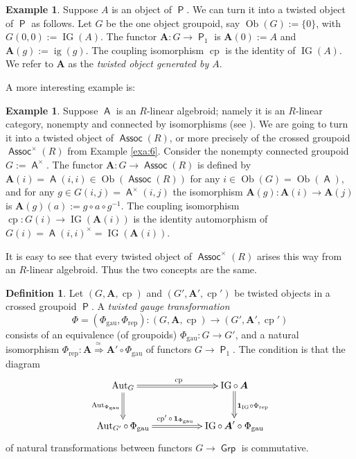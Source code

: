 \documentclass[a4paper, 10pt]{amsart}
\theoremstyle{definition}
\newtheorem{dfn}[equation]{Definition}
\newtheorem{exa}[equation]{Example}
\numberwithin{equation}{section}
\newcommand{\opn}{\operatorname}
\newcommand{\cat}[1]{\operatorname{\mathsf{#1}}}
\newcommand{\mrm}[1]{\mathrm{#1}}
\newcommand{\bsym}[1]{\boldsymbol{#1}}
\newcommand{\twoiso}{\stackrel{\simeq\ }{\Longrightarrow}}
\begin{document}
\begin{exa} \label{exa:8}
Suppose $A$ is an object of $\cat{P}$. We can turn it into a
twisted object of $\cat{P}$ as follows. Let $G$ be the one
object groupoid, say $\opn{Ob}(G) := \{ 0 \}$, with
$G(0,0) := \opn{IG}(A)$. 
The functor $\bsym{A} : G \to \cat{P}_1$ is 
$\bsym{A}(0) := A$ and $\bsym{A}(g) := \opn{ig}(g)$. 
The coupling isomorphism $\opn{cp}$ is the identity of
$\opn{IG}(A)$. 
We refer to $\bsym{A}$ as the {\em twisted object generated by $A$}.
\end{exa}

A more interesting example is:

\begin{exa} \label{exa:7}
Suppose $\cat{A}$ is an $R$-linear algebroid; namely it is an $R$-linear
category, nonempty and connected by isomorphisms (see \cite{Ko2}). We are going
to turn it into a twisted object of $\cat{Assoc}(R)$, or more precisely of the
crossed groupoid $\cat{Assoc}^{\times}(R)$ from Example \ref{exa:6}.
Consider the nonempty connected groupoid $G := \cat{A}^{\times}$.
The functor $\bsym{A} : G \to \cat{Assoc}(R)$
is defined by 
$\bsym{A}(i) = \cat{A}(i,i) \in \opn{Ob}(\cat{Assoc}(R))$ 
for any $i \in \opn{Ob}(G) = \opn{Ob}(\cat{A})$,
and for any  
$g \in G(i, j) = \cat{A}^{\times}(i,j)$
the isomorphism 
$\bsym{A}(g) : \bsym{A}(i) \to \bsym{A}(j)$ is 
$\bsym{A}(g)(a) := g \circ a \circ g^{-1}$.
The coupling isomorphism
$\opn{cp} : G(i) \to \opn{IG}(\bsym{A}(i))$
is the identity automorphism of
$G(i) = \cat{A}(i,i)^{\times} = \opn{IG}(\bsym{A}(i))$.

It is easy to see that every twisted object of  $\cat{Assoc}^{\times}(R)$ arises
this way from an $R$-linear algebroid. Thus the two concepts are the same.
\end{exa}

\begin{dfn} \label{dfn:29}
Let $(G, \bsym{A}, \opn{cp})$ and 
$(G', \bsym{A}', \opn{cp}')$ be twisted objects in a crossed groupoid $\cat{P}$.
A {\em twisted gauge transformation}
\[ \Phi = (\Phi_{\mrm{gau}}, \Phi_{\mrm{rep}}) :
(G, \bsym{A}, \opn{cp}) \to (G', \bsym{A}', \opn{cp}') \]
consists of an equivalence (of groupoids)
$\Phi_{\mrm{gau}} : G \to G'$,
and a natural isomorphism 
$\Phi_{\mrm{rep}} : \bsym{A} \twoiso \bsym{A}' \circ \Phi_{\mrm{gau}}$
of functors $G \to \cat{P}_1$.
The condition is that the diagram 
\[ \UseTips \xymatrix @C=12ex @R=6ex {
\opn{Aut}_{G}
\ar@{=>}[r]^{\opn{cp}}
\ar@{=>}[d]_{\opn{Aut}_{\Phi_{\mrm{gau}}}}
& 
\opn{IG} \circ \, \bsym{A}
\ar@{=>}[d]^{\bsym{1}_{\opn{IG}} \circ \Phi_{\mrm{rep}}}
\\
\opn{Aut}_{G'} \circ \, \Phi_{\mrm{gau}}
\ar@{=>}[r]^(0.47){\opn{cp}' \circ\, \bsym{1}_{\Phi_{\mrm{gau}}}}
& 
\opn{IG} \circ \, \bsym{A}' \circ \Phi_{\mrm{gau}}
} \]
of natural transformations between functors $G \to \cat{Grp}$
is commutative.
\end{dfn}
\end{document}
